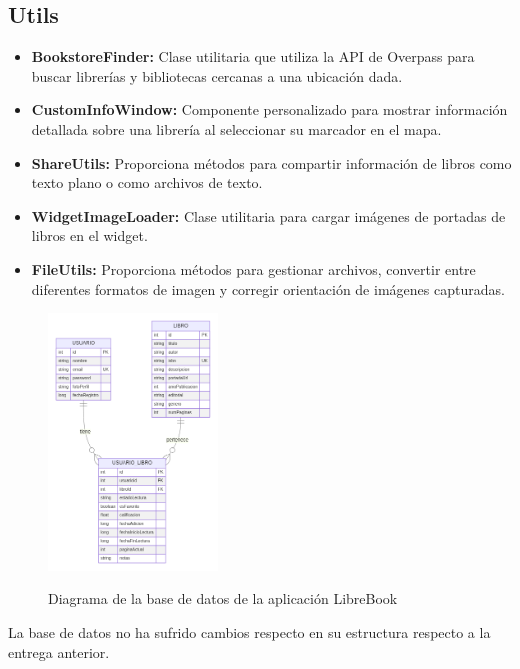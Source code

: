 \documentclass[a4paper,11pt]{report}
\begin{document}
      \subsection{Utils}
        \begin{itemize}
          \item \textbf{BookstoreFinder:} Clase utilitaria que utiliza la API de Overpass para buscar librerías y bibliotecas cercanas a una ubicación dada.
          \item \textbf{CustomInfoWindow:} Componente personalizado para mostrar información detallada sobre una librería al seleccionar su marcador en el mapa.
          \item \textbf{ShareUtils:} Proporciona métodos para compartir información de libros como texto plano o como archivos de texto.
          \item \textbf{WidgetImageLoader:} Clase utilitaria para cargar imágenes de portadas de libros en el widget.
          \item \textbf{FileUtils:} Proporciona métodos para gestionar archivos, convertir entre diferentes formatos de imagen y corregir orientación de imágenes capturadas.
        \end{itemize}
      \begin{figure}[H]
        \centering
        \href{https://raw.githubusercontent.com/Xabierland/DAS-Proyecto/refs/heads/main/Documentation/Memoria2/.img/diagrama-bd.svg}{%
          \includegraphics[width=0.4\textwidth]{.img/diagrama-bd.png}
        }
        \caption{Diagrama de la base de datos de la aplicación LibreBook}
        \label{fig:diagrama-bd}
      \end{figure}
      La base de datos no ha sufrido cambios respecto en su estructura respecto a la entrega anterior.
\end{document}
